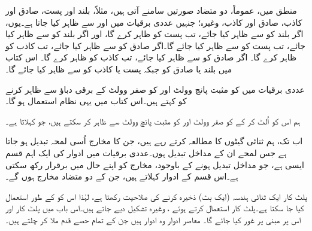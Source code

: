 منطق میں، عموماً، دو متضاد صورتیں سامنے آتی ہیں، مثلاً، بلند اور پست، صادق اور کاذب، صادق اور کاذب، وغیرہ؛ جنہیں عددی برقیات میں  اور  سے ظاہر کیا جاتا ہے۔یوں، اگر بلند کو  سے ظاہر کیا جائے، تب پست کو  ظاہر کرے گا، اور اگر بلند کو سے ظاہر کیا جائے، تب پست کو  سے ظاہر کیا جائے گا۔اگر صادق کو  سے ظاہر کیا جائے، تب کاذب کو  ظاہر کرے گا۔ اگر صادق کو  سے ظاہر کیا جائے، تب کاذب کو  ظاہر کرے گا۔ اس کتاب میں بلند یا صادق کو  جبکہ پست یا کاذب کو  سے ظاہر کیا جائے گا۔

عددی برقیات میں  کو مثبت پانچ وولٹ  اور  کو صفر وولٹ  کے برقی دباؤ سے ظاہر کرنے کو  کہتے ہیں۔اس کتاب میں یہی نظام استعمال ہو گا۔

ہم اس کو اُلٹ کر کے  کو صفر وولٹ  اور  کو مثبت پانچ وولٹ  سے ظاہر کر سکتے ہیں، جو  کہلاتا ہے۔


اب تک، ہم ثنائی گیٹوں کا مطالعہ کرتے رہے ہیں، جن کا مخارج اُسی لمحہ تبدیل ہو جاتا ہے جس لمحے ان کے مداخل تبدیل ہوں۔عددی برقیات میں ادوار کی ایک اہم قسم ایسی ہے، جو مداخل تبدیل ہونے کے باوجود، مخارج کو اپنے حال میں برقرار رکھ سکتی ہے۔اس قسم کے ادوار  کہلاتے ہیں، جن کے دو متضاد مخارج ہوں گے۔

پلٹ کار ایک ثنائی ہندسہ (ایک بٹ) ذخیرہ کرنے کی صلاحیت رکھتا ہے، لہٰذا اس کو  کے طور استعمال کیا جا سکتا ہے۔پلٹ کار استعمال کرتے ہوئے ، وغیرہ تشکیل دیے جاتے ہیں۔اس باب میں پلٹ کار اور اس پر مبنی  پر غور کیا جائے گا۔ معاصر ادوار وہ ادوار ہیں جن کے تمام حصے قدم ملا کر چلتے ہیں۔


